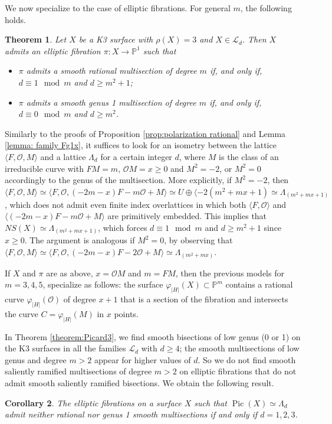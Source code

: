 \documentclass{amsart}
\newtheorem{theorem}{Theorem}[section]
\newtheorem{corollary}[theorem]{Corollary}
\theoremstyle{definition}
\numberwithin{equation}{section}
\newcommand{\ra}{\rightarrow}
\renewcommand{\O}{\mathcal{O}}
\DeclareMathOperator{\Pic}{Pic}
\begin{document}
We now specialize to the case of elliptic fibrations. For general $m$, the following holds.

\begin{theorem}\label{theorem:Picard3 higher m}
Let $X$ be a K3 surface with $\rho(X)=3$ and $X\in\mathcal{L}_d$. Then $X$ admits an elliptic fibration $\pi: X \ra \mathbb{P}^1$ such that 
\begin{itemize}
\item
$\pi$ admits a smooth rational multisection of degree $m$ if, and only if, $d\equiv 1\mod m$ and $d\geq m^2+1$;
\item $\pi$ admits a smooth genus 1 multisection of degree $m$ if, and only if, $d\equiv 0\mod m$ and $d\geq m^2$.
\end{itemize}
\end{theorem}
 \proof Similarly to the proofs of Proposition \ref{prop:polarization rational} and Lemma \ref{lemma: family Fg1x}, it suffices to look for an isometry between the lattice $\langle F,\O, M\rangle$ and a lattice $\Lambda_d$ for a certain integer $d$, where $M$ is the class of an irreducible curve with $FM=m$, $\mathcal{O}M=x\geq 0$ and $M^2=-2$, or $M^2=0$ accordingly to the genus of the multisection. More explicitly, if $M^2=-2$, then $\langle F,\O,M\rangle\simeq \langle F,\O, (-2m-x)F-m\mathcal{O}+M\rangle\simeq U\oplus \langle-2(m^2+mx+1)\simeq \Lambda_{(m^2+mx+1)}$, which does not admit even finite index overlattices in which both $\langle F,\mathcal{O}\rangle$ and $\langle (-2m-x)F-m\mathcal{O}+M\rangle$ are primitively embedded. This implies that $NS(X)\simeq \Lambda_{(m^2+mx+1)}$, which forces $d\equiv 1\mod m$ and $d\geq m^2+1$ since $x\geq 0$. The argument is analogous if $M^2=0$, by observing that $\langle F,\O,M\rangle\simeq \langle F,\O, (-2m-x)F-2\mathcal{O}+M\rangle\simeq \Lambda_{(m^2+mx)}$.\endproof

If $X$ and $\pi$ are as above, $x=\mathcal{O}M$ and $m=FM$, then the previous models for $m=3,4,5$, specialize as follows:
the surface $\varphi_{|H|}(X)\subset\mathbb{P}^m$ contains a rational curve $\varphi_{|H|}(\mathcal{O})$ of degree $x+1$ that is a section of the fibration and intersects the curve $C=\varphi_{|H|}(M)$ in $x$ points.


In Theorem \ref{theorem:Picard3}, we find smooth bisections of low genus (0 or 1) on the K3 surfaces in all the families $\mathcal{L}_{d}$ with $d\geq 4$; the smooth multisections of low genus and degree $m>2$ appear for higher values of $d$. So we do not find smooth saliently ramified multisections of degree $m>2$ on elliptic fibrations that do not admit smooth saliently ramified bisections. We obtain the following result. 
\begin{corollary}\label{cor: no multisections for low d}
The elliptic fibrations on a surface $X$ such that $\Pic(X)\simeq \Lambda_d$ admit neither rational nor genus 1 smooth multisections if and only if $d=1,2,3$.\end{corollary}
\end{document}

